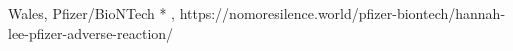           {Wales, }
          {}
          {Pfizer/BioNTech}
          {*}
          {
            ,
          }
          {https://nomoresilence.world/pfizer-biontech/hannah-lee-pfizer-adverse-reaction/}

